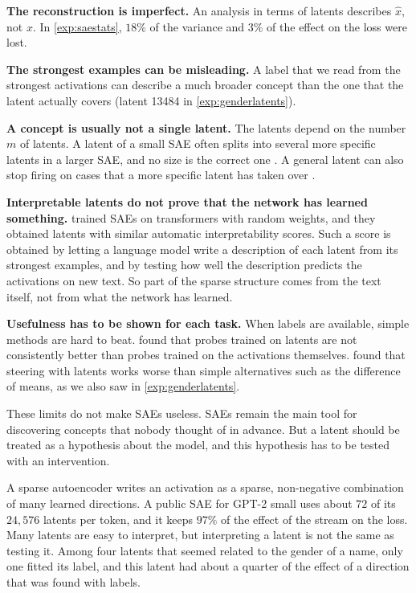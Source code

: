 \begin{caution}
\textbf{The reconstruction is imperfect.} An analysis in terms of latents describes $\hat x$, not $x$. In
\cref{exp:saestats}, $18\%$ of the variance and $3\%$ of the effect on the loss were lost.

\textbf{The strongest examples can be misleading.} A label that we read from the strongest activations can
describe a much broader concept than the one that the latent actually covers (latent 13484 in
\cref{exp:genderlatents}).

\textbf{A concept is usually not a single latent.} The latents depend on the number $m$ of latents. A latent of
a small SAE often splits into several more specific latents in a larger SAE, and no size is the correct one
\citep{leask2025sparse}. A general latent can also stop firing on cases that a more specific latent has taken over
\citep{chanin2024absorption}.

\textbf{Interpretable latents do not prove that the network has learned something.} \citet{heap2025sparse}
trained SAEs on transformers with random weights, and they obtained latents with similar automatic
interpretability scores. Such a score is obtained by letting a language model write a description of each latent
from its strongest examples, and by testing how well the description predicts the activations on new text. So part
of the sparse structure comes from the text itself, not from what the network has learned.

\textbf{Usefulness has to be shown for each task.} When labels are available, simple methods are hard to beat.
\citet{kantamneni2025sparse} found that probes trained on latents are not consistently better than probes trained on
the activations themselves. \citet{wu2025axbench} found that steering with latents works worse than simple
alternatives such as the difference of means, as we also saw in \cref{exp:genderlatents}.
\end{caution}

These limits do not make SAEs useless. SAEs remain the main tool for discovering concepts that nobody thought of
in advance. But a latent should be treated as a hypothesis about the model, and this hypothesis has to be tested
with an intervention.

\begin{takeaways}
A sparse autoencoder writes an activation as a sparse, non-negative combination of many learned directions. A
public SAE for GPT-2 small uses about $72$ of its $24{,}576$ latents per token, and it keeps $97\%$ of the effect of
the stream on the loss. Many latents are easy to interpret, but interpreting a latent is not the same as testing
it. Among four latents that seemed related to the gender of a name, only one fitted its label, and this latent had
about a quarter of the effect of a direction that was found with labels.
\end{takeaways}

